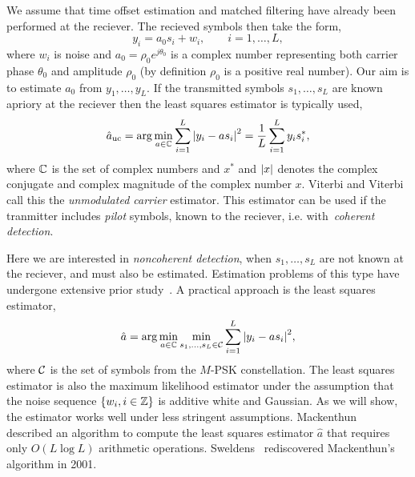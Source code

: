 \documentclass[conference]{IEEEtran}
\begin{document}
We assume that time offset estimation and matched filtering have already been performed at the reciever.  The recieved symbols then take the form,
\begin{equation}\label{eq:sigmod}
y_i = a_0 s_i + w_i, \qquad i = 1, \dots, L,
\end{equation}
where $w_i$ is noise and $a_0 = \rho_0 e^{j\theta_0}$ is a complex number representing both carrier phase $\theta_0$ and amplitude $\rho_0$ (by definition $\rho_0$ is a positive real number).  Our aim is to estimate $a_0$ from $y_1, \dots, y_L$.  If the transmitted symbols $s_1, \dots, s_L$ are known apriory at the reciever then the least squares estimator is typically used,
\[
\hat{a}_{\text{uc}} = \arg \min_{a \in {\mathbb C}} \sum_{i = 1}^L {\left\vert  y_i - a s_i  \right\vert}^2  = \frac{1}{L} \sum_{i = 1}^L y_i s_i^*,
\]
where ${\mathbb C}$ is the set of complex numbers and $x^*$ and ${\left\vert x \right\vert}$ denotes the complex conjugate and complex magnitude of the complex number $x$.  Viterbi and Viterbi~\cite{ViterbiViterbi_phase_est_1983} call this the \emph{unmodulated carrier} estimator.  This estimator can be used if the tranmitter includes \emph{pilot} symbols, known to the reciever, i.e. with~\emph{coherent detection}.

Here we are interested in \emph{noncoherent detection}, when $s_1, \dots, s_L$ are not known at the reciever, and must also be estimated.  Estimation problems of this type have undergone extensive prior study~\cite{ViterbiViterbi_phase_est_1983,Cowley_ref_sym_carr_1998,Wilson1989,Makrakis1990,Liu1991,Mackenthun1994,Sweldens2001,McKilliamLinearTimeBlockPSK2009}.  A practical approach is the least squares estimator,
\[
\hat{a} = \arg\min_{a \in {\mathbb C}} \min_{s_1, \dots, s_L \in \mathcal C} \sum_{i = 1}^L {\left\vert  y_i - a s_i  \right\vert}^2,
\]
where $\mathcal C$ is the set of symbols from the $M$-PSK constellation.  The least squares estimator is also the maximum likelihood estimator under the assumption that the noise sequence $\{w_i, i \in {\mathbb Z}\}$ is additive white and Gaussian.  As we will show, the estimator works well under less stringent assumptions.  Mackenthun~\cite{Mackenthun1994} described an algorithm to compute the least squares estimator $\hat{a}$ that requires only $O(L \log L)$ arithmetic operations.  Sweldens~\cite{Sweldens2001} rediscovered Mackenthun's algorithm in 2001.

\end{document}
